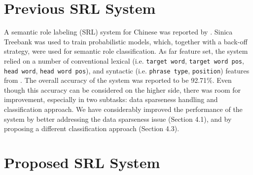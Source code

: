 \documentclass[11pt]{article}
\begin{document}
\section{Previous SRL System}
A semantic role labeling (SRL) system for Chinese was reported by \cite{you-chen:2004}. Sinica Treebank was used to train probabilistic models, which, together with a back-off strategy, were used for semantic role classification. As far feature set, the system relied on a number of conventional lexical (i.e. \verb+target word+, \verb+target word pos+, \verb+head word+,  \verb+head word pos+), and syntactic (i.e. \verb+phrase type+,  \verb+position+) features from \cite{Gildea:2002}. %
The overall accuracy of the system was reported to be 92.71\%. Even though this accuracy can be considered on the higher side, there was room for improvement, especially in two subtasks: data sparseness handling and classification approach. We have considerably improved the performance of the system by better addressing the data sparseness issue (Section 4.1), and by proposing a different classification approach (Section 4.3). 
\section{Proposed SRL System}
\end{document}
